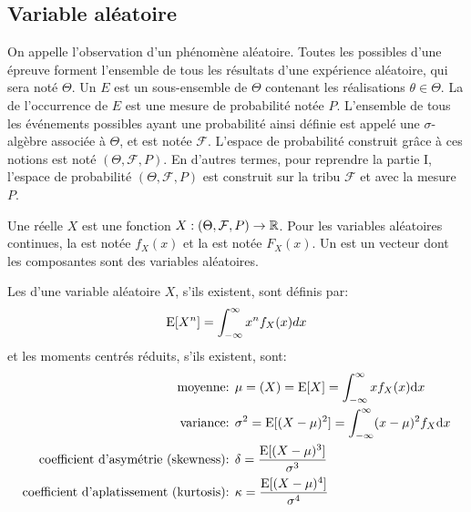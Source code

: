 \medskip
\subsection{Variable aléatoire}

On appelle  l'observation d'un phénomène aléatoire.
Toutes les  possibles d'une épreuve forment l'ensemble de tous les résultats d'une expérience aléatoire, qui sera noté $\Theta$. 
Un  $E$ est un sous-ensemble de $\Theta$ contenant les réalisations $\theta\in\Theta$. 
La  de l'occurrence de $E$ est une mesure de probabilité notée $P$.
L'ensemble de tous les événements possibles ayant une probabilité ainsi définie est appelé une $\sigma$-algèbre associée à $\Theta$, et est notée $\mathcal{F}$.
L'espace de probabilité construit grâce à ces notions est noté $(\Theta,\mathcal{F},P)$.
En d'autres termes, pour reprendre la partie I, l'espace de probabilité $(\Theta,\mathcal{F},P)$ est construit sur la tribu $\mathcal{F}$ et avec la mesure $P$.

\medskip
Une  réelle $X$ est une fonction $X : (\Theta,\mathcal{F},P) \rightarrow \mathbb R$. 
Pour les variables aléatoires continues, la  est notée $f_X(x)$ et la  est notée $F_X(x)$.
Un  est un vecteur dont les composantes sont des variables aléatoires.

\medskip
\begin{definition}
Les  d'une variable aléatoire $X$, s'ils existent, sont définis par:
\begin{equation}
\operatorname{E}[X^n] = \displaystyle\int_{-\infty}^\infty x^nf_X(x)dx
\end{equation}
et les moments centrés réduits, s'ils existent, sont:
\begin{align}
\text{moyenne: } & \mu = \left(X\right) = \operatorname{E}[X] = \displaystyle\int_{-\infty}^\infty xf_X(x) \text{d} x  \\
\text{variance: } & \sigma^2 = \operatorname{E}[(X-\mu)^2] = \displaystyle\int_{-\infty}^\infty (x-\mu)^2f_X \text{d} x \\
\text{coefficient d'asymétrie (skewness): } & \delta = \dfrac{\operatorname{E}[(X-\mu)^3]}{\sigma^3} \\
\text{coefficient d'aplatissement (kurtosis): } & \kappa = \dfrac{\operatorname{E}[(X-\mu)^4]}{\sigma^4}
\end{align}
\end{definition}

